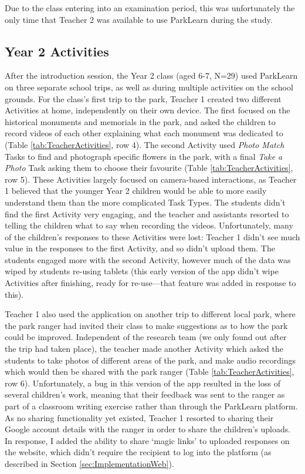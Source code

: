 Due to the class entering into an examination period, this was unfortunately the only time that Teacher 2 was available to use ParkLearn during the study.

\subsection{Year 2 Activities}

After the introduction session, the Year 2 class (aged 6-7, N=29) used ParkLearn on three separate school trips, as well as during multiple activities on the school grounds. For the class's first trip to the park, Teacher 1 created two different Activities at home, independently on their own device. The first focused on the historical monuments and memorials in the park, and asked the children to record videos of each other explaining what each monument was dedicated to (Table \ref{tab:TeacherActivities}, row 4). The second Activity used \textit{Photo Match} Tasks to find and photograph specific flowers in the park, with a final \textit{Take a Photo} Task asking them to choose their favourite (Table \ref{tab:TeacherActivities}, row 5). These Activities largely focused on camera-based interactions, as Teacher 1 believed that the younger Year 2 children would be able to more easily understand them than the more complicated Task Types. The students didn't find the first Activity very engaging, and the teacher and assistants resorted to telling the children what to say when recording the videos. Unfortunately, many of the children's responses to these Activities were lost: Teacher 1 didn't see much value in the responses to the first Activity, and so didn't upload them. The students engaged more with the second Activity, however much of the data was wiped by students re-using tablets (this early version of the app didn't wipe Activities after finishing, ready for re-use---that feature was added in response to this).   

Teacher 1 also used the application on another trip to different local park, where the park ranger had invited their class to make suggestions as to how the park could be improved. Independent of the research team (we only found out after the trip had taken place), the teacher made another Activity which asked the students to take photos of different areas of the park, and make audio recordings which would then be shared with the park ranger (Table \ref{tab:TeacherActivities}, row 6). Unfortunately, a bug in this version of the app resulted in the loss of several children's work, meaning that their feedback was sent to the ranger as part of a classroom writing exercise rather than through the ParkLearn platform. As no sharing functionality yet existed, Teacher 1 resorted to sharing their Google account details with the ranger in order to share the children's uploads. In response, I added the ability to share `magic links' to uploaded responses on the website, which didn't require the recipient to log into the platform (as described in Section \ref{sec:ImplementationWeb}).

